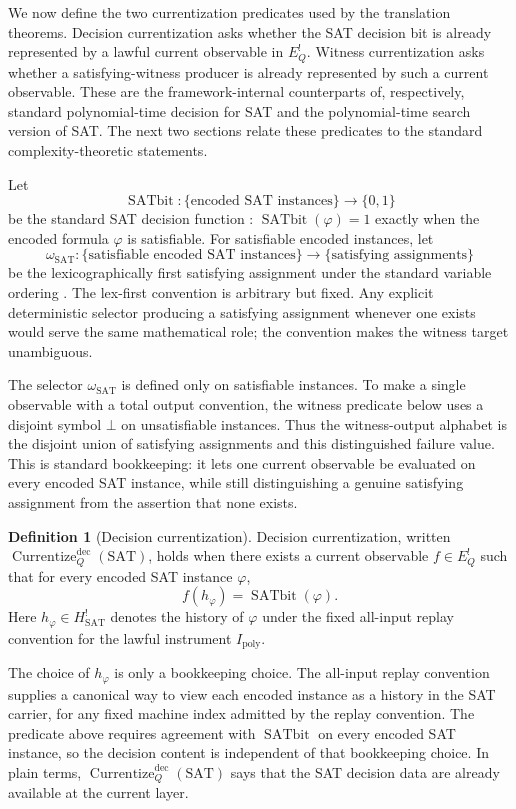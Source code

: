\documentclass[11pt]{article}
\newcommand{\Hsat}{H^{!}_{\mathrm{SAT}}}
\newcommand{\Ipoly}{I_{\mathrm{poly}}}
\newcommand{\EQbang}{E^{!}_{Q}}
\newcommand{\SATbit}{\operatorname{SATbit}}
\newcommand{\omegaSATsel}{\omega_{\mathrm{SAT}}}
\newcommand{\CurrentizeDec}{\operatorname{Currentize}^{\mathrm{dec}}_{Q}}
\theoremstyle{definition}
\newtheorem{definition}[theorem]{Definition}
\begin{document}
We now define the two currentization predicates used by the
translation theorems.  Decision currentization asks whether the SAT
decision bit is already represented by a lawful current observable in
\(\EQbang\).  Witness currentization asks whether a satisfying-witness
producer is already represented by such a current observable.  These
are the framework-internal counterparts of, respectively, standard
polynomial-time decision for SAT and the polynomial-time search
version of SAT.  The next two sections relate these predicates to the
standard complexity-theoretic statements.

Let
\[
  \SATbit:\{\text{encoded SAT instances}\}\longrightarrow\{0,1\}
\]
be the standard SAT decision function
\citep{Cook1971TheoremProving}: \(\SATbit(\varphi)=1\) exactly when
the encoded formula \(\varphi\) is satisfiable.  For satisfiable encoded instances, let
\[
  \omegaSATsel:
  \{\text{satisfiable encoded SAT instances}\}
  \longrightarrow
  \{\text{satisfying assignments}\}
\]
be the lexicographically first satisfying assignment under the
standard variable ordering
\citep{HemaspaandraOgihara2002SelfReducibility}.  The lex-first convention is arbitrary but
fixed.  Any explicit deterministic selector producing a satisfying
assignment whenever one exists would serve the same mathematical role;
the convention makes the witness target unambiguous.

The selector \(\omegaSATsel\) is defined only on satisfiable
instances.  To make a single observable with a total output convention,
the witness predicate below uses a disjoint symbol \(\bot\) on
unsatisfiable instances.  Thus the witness-output alphabet is the
disjoint union of satisfying assignments and this distinguished
failure value.  This is standard bookkeeping: it lets one current
observable be evaluated on every encoded SAT instance, while still
distinguishing a genuine satisfying assignment from the assertion that
none exists.

\begin{definition}[Decision currentization]
\label{def:pvnp:currentize-dec}
Decision currentization, written \(\CurrentizeDec(\mathrm{SAT})\),
holds when there exists a current observable \(f\in\EQbang\) such that
for every encoded SAT instance \(\varphi\),
\[
  f(h_{\varphi})=\SATbit(\varphi).
\]
Here \(h_{\varphi}\in\Hsat\) denotes the history of \(\varphi\) under
the fixed all-input replay convention for the lawful instrument
\(\Ipoly\).
\end{definition}

The choice of \(h_{\varphi}\) is only a bookkeeping choice.  The
all-input replay convention supplies a canonical way to view each
encoded instance as a history in the SAT carrier, for any fixed
machine index admitted by the replay convention.  The predicate above
requires agreement with \(\SATbit\) on every encoded SAT instance, so
the decision content is independent of that bookkeeping choice.  In
plain terms, \(\CurrentizeDec(\mathrm{SAT})\) says that the SAT
decision data are already available at the current layer.
\end{document}
